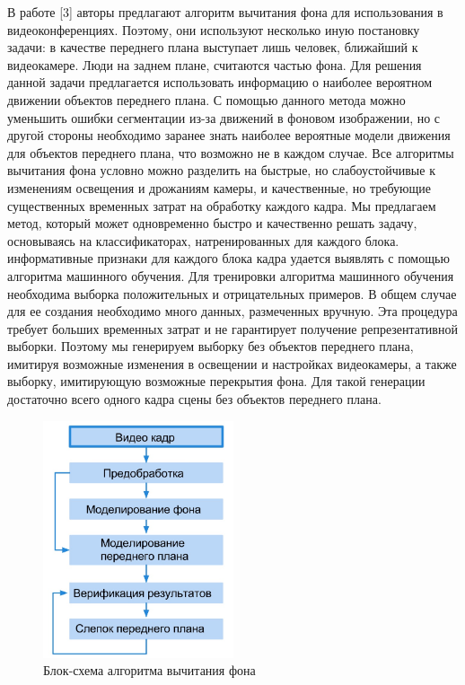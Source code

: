 \documentclass[12pt]{article}
\begin{document}
В работе [3] авторы предлагают алгоритм вычитания фона для использования в видеоконференциях. Поэтому, они используют несколько иную постановку задачи: в качестве переднего плана выступает лишь человек, ближайший к видеокамере. Люди на заднем плане, считаются частью фона. Для решения данной задачи предлагается использовать информацию о наиболее вероятном движении объектов переднего плана. С помощью данного метода можно уменьшить ошибки сегментации из-за движений в фоновом изображении, но с другой стороны необходимо заранее знать наиболее вероятные модели движения для объектов переднего плана, что возможно не в каждом случае. Все алгоритмы вычитания фона условно можно разделить на быстрые, но слабоустойчивые к изменениям освещения и дрожаниям камеры, и качественные, но требующие существенных временных затрат на обработку каждого кадра. Мы предлагаем метод, который может одновременно быстро и качественно решать задачу, основываясь на классификаторах, натренированных для каждого блока. информативные признаки для каждого блока кадра удается выявлять с помощью алгоритма машинного обучения. Для тренировки алгоритма машинного обучения необходима выборка положительных и отрицательных примеров. В общем случае для ее создания необходимо много данных, размеченных вручную. Эта процедура требует больших временных затрат и не гарантирует получение репрезентативной выборки. Поэтому мы генерируем выборку без объектов переднего плана, имитируя возможные изменения в освещении и настройках видеокамеры, а также выборку, имитирующую возможные перекрытия фона. Для
такой генерации достаточно всего одного кадра сцены без объектов переднего плана.  

		\begin{figure}[h!]
			\centering
			\includegraphics[width=0.5\textwidth]{pic/back_ground_substraction.jpg}
			\caption{Блок-схема алгоритма вычитания фона}
		\end{figure}
\end{document}
